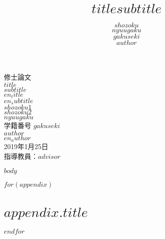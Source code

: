 \documentclass[a4paper,10.5pt]{jsreport}
\title{ \Large $title$\newline{\ddash}$subtitle${\ddash}}
\author{$shozoku$\\$nyuugaku$\\$gakuseki$\\$author$}
\date{}
\begin{document}
\begin{titlepage}

\begin{center}
\vspace*{100truept}
{\Large 修士論文}\\
\vspace{50truept}
{\huge $title$}\\ %
\vspace{10truept}
{\huge $subtitle$}\\ %
\vspace{10truept}
{\large $en_title$}\\ %
{\large $en_subtitle$}\\
\vspace{60truept}
{\Large $shozoku1$}\\
{\Large $shozoku2$}\\
\vspace{20truept}
{\Large $nyuugaku$}\\ %
\vspace{20truept}
{\Large 学籍番号 $gakuseki$}\\
\vspace{20truept}
{\Large $author$}\\ %
{\Large $en_author$}\\ %
\vspace{10truept}
{\Large 2019年1月25日}\\ %
\vspace{20truept}
{\large
指導教員：$advisor$\\
}
\end{center}

\end{titlepage}

\tableofcontents

$body$

\printbibliography[title = 参考文献]



\appendix

$for(appendix)$
\chapter{$appendix.title$}

$endfor$
\end{document}
